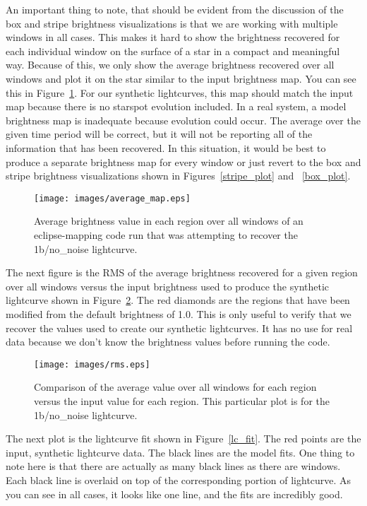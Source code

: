 An important thing to note, that should be evident from the discussion of the box and stripe brightness visualizations is that we are working with multiple windows in all cases. This makes it hard to show the brightness recovered for each individual window on the surface of a star in a compact and meaningful way. Because of this, we only show the average brightness recovered over all windows and plot it on the star similar to the input brightness map. You can see this in Figure~\ref{average_map}. For our synthetic lightcurves, this map should match the input map because there is no starspot evolution included. In a real system, a model brightness map is inadequate because evolution could occur. The average over the given time period will be correct, but it will not be reporting all of the information that has been recovered. In this situation, it would be best to produce a separate brightness map for every window or just revert to the box and stripe brightness visualizations shown in Figures~\ref{stripe_plot} and ~\ref{box_plot}.

\begin{figure}[h]
	\centering
	\texttt{[image: images/average\_map.eps]}
	\caption{Average brightness value in each region over all windows of an eclipse-mapping code run that was attempting to recover the 1b/no\_noise lightcurve.}
	\label{average_map}
\end{figure}

The next figure is the RMS of the average brightness recovered for a given region over all windows versus the input brightness used to produce the synthetic lightcurve shown in Figure~\ref{rms}. The red diamonds are the regions that have been modified from the default brightness of 1.0. This is only useful to verify that we recover the values used to create our synthetic lightcurves. It has no use for real data because we don't know the brightness values before running the code.

\begin{figure}[h]
	\centering
	\texttt{[image: images/rms.eps]}
	\caption{Comparison of the average value over all windows for each region versus the input value for each region. This particular plot is for the 1b/no\_noise lightcurve.}
	\label{rms}
\end{figure}

The next plot is the lightcurve fit shown in Figure~\ref{lc_fit}. The red points are the input, synthetic lightcurve data. The black lines are the model fits. One thing to note here is that there are actually as many black lines as there are windows. Each black line is overlaid on top of the corresponding portion of lightcurve. As you can see in all cases, it looks like one line, and the fits are incredibly good. 

